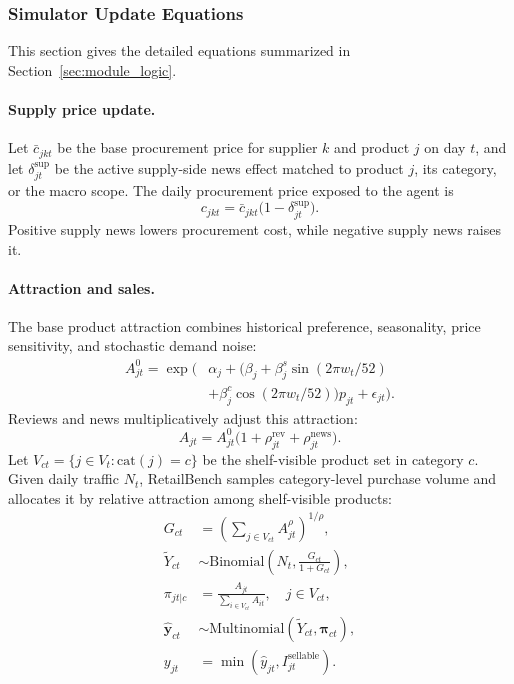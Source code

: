 \subsubsection{Simulator Update Equations}
\label{app:simulator_update_equations}

This section gives the detailed equations summarized in Section~\ref{sec:module_logic}.

\paragraph{Supply price update.}
Let $\bar c_{jkt}$ be the base procurement price for supplier $k$ and product $j$ on day $t$, and let $\delta^{\mathrm{sup}}_{jt}$ be the active supply-side news effect matched to product $j$, its category, or the macro scope. The daily procurement price exposed to the agent is
\begin{equation}
c_{jkt}=\bar c_{jkt}\bigl(1-\delta^{\mathrm{sup}}_{jt}\bigr).
\label{eq:supply_price}
\end{equation}
Positive supply news lowers procurement cost, while negative supply news raises it.

\paragraph{Attraction and sales.}
The base product attraction combines historical preference, seasonality, price sensitivity, and stochastic demand noise:
\begin{equation}
\begin{aligned}
A^{0}_{jt}
=\exp\!\Big(&\alpha_j+
\bigl(\beta_j+\beta^s_j\sin(2\pi w_t/52)\\
&+\beta^c_j\cos(2\pi w_t/52)\bigr)p_{jt}
+\epsilon_{jt}\Big).
\end{aligned}
\label{eq:base_attraction}
\end{equation}
Reviews and news multiplicatively adjust this attraction:
\begin{equation}
A_{jt}=A^{0}_{jt}\bigl(1+\rho^{\mathrm{rev}}_{jt}+\rho^{\mathrm{news}}_{jt}\bigr).
\label{eq:adjusted_attraction}
\end{equation}
Let $V_{ct}=\{j\in V_t:\mathrm{cat}(j)=c\}$ be the shelf-visible product set in category $c$. Given daily traffic $N_t$, RetailBench samples category-level purchase volume and allocates it by relative attraction among shelf-visible products:
\begin{equation}
\begin{aligned}
G_{ct}
&=\left(\sum_{j\in V_{ct}} A_{jt}^{\rho}\right)^{1/\rho},\\
\tilde Y_{ct}
&\sim \mathrm{Binomial}\!\left(N_t,\frac{G_{ct}}{1+G_{ct}}\right),\\
\pi_{jt|c}
&=\frac{A_{jt}}{\sum_{i\in V_{ct}}A_{it}}, \quad j\in V_{ct},\\
\hat{\mathbf{y}}_{ct}
&\sim \mathrm{Multinomial}\!\left(\tilde Y_{ct},\boldsymbol{\pi}_{ct}\right),\\
y_{jt}
&=\min\!\left(\hat y_{jt}, I_{jt}^{\mathrm{sellable}}\right).
\end{aligned}
\label{eq:demand_sales}
\end{equation}

